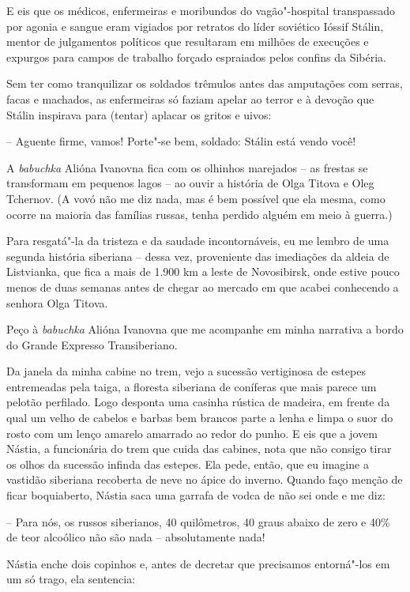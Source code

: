 E eis que os médicos, enfermeiras e moribundos do vagão"-hospital
transpassado por agonia e sangue eram vigiados por retratos do líder
soviético Ióssif Stálin, mentor de julgamentos políticos que resultaram
em milhões de execuções e expurgos para campos de trabalho forçado
espraiados pelos confins da Sibéria.

Sem ter como tranquilizar os soldados trêmulos antes das amputações com
serras, facas e machados, as enfermeiras só faziam apelar ao terror e à
devoção que Stálin inspirava para (tentar) aplacar os gritos e uivos:

-- Aguente firme, vamos! Porte"-se bem, soldado: Stálin está vendo você!

A \emph{babuchka} Alióna Ivanovna fica com os olhinhos marejados -- as
frestas se transformam em pequenos lagos -- ao ouvir a história de Olga
Titova e Oleg Tchernov. (A vovó não me diz nada, mas é bem possível que
ela mesma, como ocorre na maioria das famílias russas, tenha perdido
alguém em meio à guerra.)

Para resgatá"-la da tristeza e da saudade incontornáveis, eu me lembro de
uma segunda história siberiana -- dessa vez, proveniente das imediações
da aldeia de Listvianka, que fica a mais de 1.900 km a leste de
Novosibirsk, onde estive pouco menos de duas semanas antes de chegar ao
mercado em que acabei conhecendo a senhora Olga Titova.

Peço à \emph{babuchka} Alióna Ivanovna que me acompanhe em minha
narrativa a bordo do Grande Expresso Transiberiano.

Da janela da minha cabine no trem, vejo a sucessão vertiginosa de
estepes entremeadas pela taiga, a floresta siberiana de coníferas que
mais parece um pelotão perfilado. Logo desponta uma casinha rústica de
madeira, em frente da qual um velho de cabelos e barbas bem brancos
parte a lenha e limpa o suor do rosto com um lenço amarelo amarrado ao
redor do punho. E eis que a jovem Nástia, a funcionária do trem que
cuida das cabines, nota que não consigo tirar os olhos da sucessão
infinda das estepes. Ela pede, então, que eu imagine a vastidão
siberiana recoberta de neve no ápice do inverno. Quando faço menção de
ficar boquiaberto, Nástia saca uma garrafa de vodca de não sei onde e me
diz:

-- Para nós, os russos siberianos, 40 quilômetros, 40 graus abaixo de
zero e 40\% de teor alcoólico não são nada -- absolutamente nada!

Nástia enche dois copinhos e, antes de decretar que precisamos
entorná"-los em um só trago, ela sentencia:

